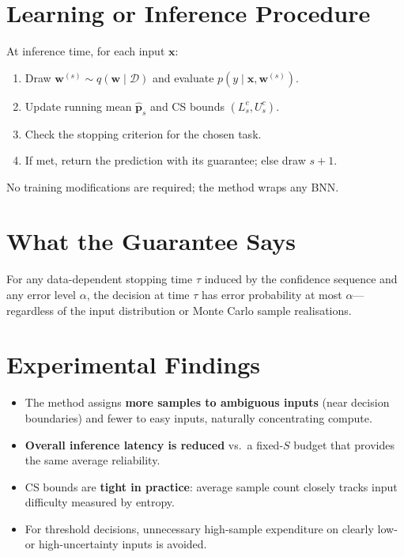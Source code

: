 \documentclass[10pt,twocolumn]{article}
\begin{document}
\section{Learning or Inference Procedure}

At inference time, for each input $\mathbf{x}$:
\begin{enumerate}[itemsep=2pt,parsep=0pt]
  \item Draw $\mathbf{w}^{(s)} \sim q(\mathbf{w} \mid \mathcal{D})$ and
    evaluate $p(y \mid \mathbf{x}, \mathbf{w}^{(s)})$.
  \item Update running mean $\hat{\mathbf{p}}_s$ and CS bounds
    $(L_s^c, U_s^c)$.
  \item Check the stopping criterion for the chosen task.
  \item If met, return the prediction with its guarantee; else draw $s+1$.
\end{enumerate}
No training modifications are required; the method wraps any BNN.

\section{What the Guarantee Says}

For any data-dependent stopping time $\tau$ induced by the confidence
sequence and any error level $\alpha$, the decision at time $\tau$
has error probability at most $\alpha$---regardless of the input
distribution or Monte Carlo sample realisations.

\section{Experimental Findings}

\begin{itemize}[itemsep=2pt,parsep=0pt]
  \item The method assigns \textbf{more samples to ambiguous inputs}
    (near decision boundaries) and fewer to easy inputs, naturally
    concentrating compute.
  \item \textbf{Overall inference latency is reduced} vs.\ a fixed-$S$
    budget that provides the same average reliability.
  \item CS bounds are \textbf{tight in practice}: average sample count
    closely tracks input difficulty measured by entropy.
  \item For threshold decisions, unnecessary high-sample expenditure
    on clearly low- or high-uncertainty inputs is avoided.
\end{itemize}
\end{document}
